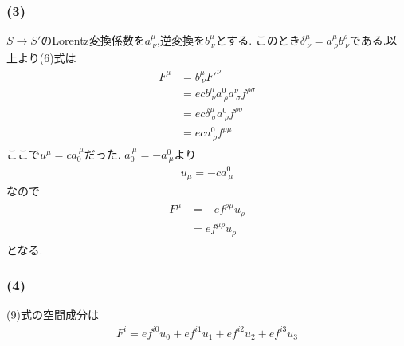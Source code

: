 \documentclass[uplatex,a4j,11pt,dvipdfmx]{jsarticle}
\begin{document}
\subsubsection*{(3)}
$S\rightarrow S'$のLorentz変換係数を$a^\mu_{\ \nu}$,逆変換を$b^\mu_{\ \nu}$とする.
このとき$\delta^\mu_{\ \nu}=a^\mu_{\ \rho}b^{\rho}_{\ \nu}$である.以上より(6)式は
\begin{align}
  \begin{split}
    F^\mu&=b^\mu_{\ \nu}F'^{\nu}\\
    &=ecb^\mu_{\ \nu}a^0_{\ \rho}a^\nu_{\ \sigma}f^{\rho\sigma}\\
    &=ec\delta^\mu_{\ \sigma}a^0_{\ \rho}f^{\rho\sigma}\\
    &=eca^0_{\ \rho}f^{\rho\mu}
  \end{split}
\end{align}
ここで$u^\mu=ca_0^{\ \mu}$だった.
$a_0^{\ \mu}=-a^0_{\ \mu}$より
\begin{align}
  u_\mu=-ca^0_{\ \mu}
\end{align}
なので
\begin{align}
  \begin{split}
    F^\mu&=-ef^{\rho\mu}u_\rho\\
    &=ef^{\mu\rho}u_\rho
  \end{split}
\end{align}
となる.
\subsubsection*{(4)}
(9)式の空間成分は
\begin{align}
  F^i=ef^{i0}u_0+ef^{i1}u_1+ef^{i2}u_2+ef^{i3}u_3
\end{align}
\end{document}
